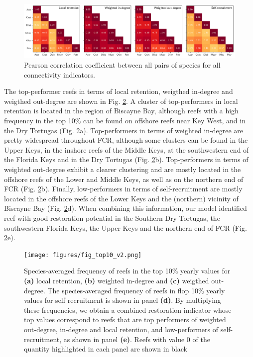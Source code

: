 \documentclass[fleqn,10pt]{wlscirep}
\begin{document}
\begin{figure}
    \centering
    \includegraphics[width=\textwidth]{figures/fig_correlation.png}
    \caption{Pearson correlation coefficient between all pairs of species for all connectivity indicators.}\label{fig:correlation}
\end{figure}

The top-performer reefs in terms of  local retention, weigthed in-degree and weigthed out-degree are shown in Fig. \ref{fig:top10}. A cluster of top-performers in local retention is located in the region of Biscayne Bay, although reefs with a high frequency in the top 10\% can be found on offshore reefs near Key West, and in the Dry Tortugas (Fig. \ref{fig:top10}a). Top-performers in terms of weighted in-degree are pretty widespread throughout FCR, although some clusters can be found in the Upper Keys, in the inshore reefs of the Middle Keys, at the southwestern end of the Florida Keys and in the Dry Tortugas (Fig. \ref{fig:top10}b). Top-performers in terms of weighted out-degree exhibit a clearer clustering and are mostly located in the offshore reefs of the Lower and Middle Keys, as well as on the northern end of FCR (Fig. \ref{fig:top10}b). Finally, low-performers in terms of self-recruitment are mostly located in the offshore reefs of the Lower Keys and the (northern) vicinity of Biscayne Bay (Fig. \ref{fig:top10}d). When combining this information, our model identified reef with good restoration potential in the Southern Dry Tortugas, the southwestern Florida Keys, the Upper Keys and the northern end of FCR (Fig. \ref{fig:top10}e).

\begin{figure}
    \centering
    \texttt{[image: figures/fig\_top10\_v2.png]}
    \caption{Species-averaged frequency of reefs in the top 10\% yearly values for \textbf{(a)} local retention, \textbf{(b)} weighted in-degree and \textbf{(c)} weigthed out-degree. The species-averaged frequency of reefs in flop 10\% yearly values for self recruitment is shown in panel \textbf{(d)}. By multiplying these frequencies, we obtain a combined restoration indicator whose top values correspond to reefs that are top performers of weighted out-degree, in-degree and local retention, and low-performers of self-recruitment, as shown in panel \textbf{(e)}. Reefs with value 0 of the quantity highlighted in each panel are shown in black}\label{fig:top10}
\end{figure}
\end{document}
